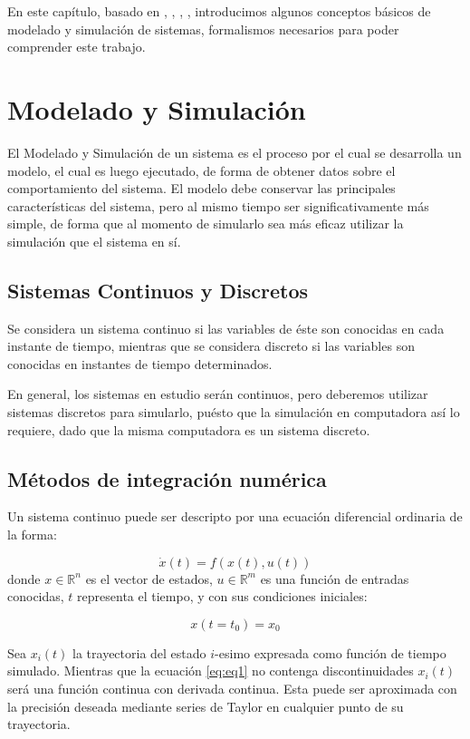 	En este capítulo, basado en \cite{Fer12}, \cite{Ber12Th}, \cite{BK11}, \cite{BK13}, introducimos algunos conceptos básicos de modelado y 
	simulación de sistemas, formalismos necesarios para poder comprender este trabajo. 

\section{Modelado y Simulación}
	El Modelado y Simulación\cite{Zeigler} de un sistema es el proceso por el cual se desarrolla un modelo, el cual es luego ejecutado, de forma de obtener datos 
	sobre el comportamiento del sistema.  El modelo debe conservar las principales características del sistema, pero al mismo tiempo ser significativamente 
	más simple, de forma que al momento de simularlo sea más eficaz utilizar la simulación que el sistema en sí.

	\subsection{Sistemas Continuos y Discretos}
	Se considera un sistema continuo si las variables de éste son conocidas en cada instante de tiempo, mientras que se considera discreto si las 
	variables son conocidas en instantes de tiempo determinados.

	En general, los sistemas en estudio serán continuos, pero deberemos utilizar sistemas discretos para simularlo, puésto que la simulación en 
	computadora así lo requiere, dado que la misma computadora es un sistema discreto.

	\subsection{Métodos de integración numérica} \label{sec:num_integ}
	Un sistema continuo puede ser descripto por una ecuación diferencial ordinaria de la forma:

	\begin{equation} \label{eq:eq1}
	\dot{x}(t) = f (x(t), u(t))
	\end{equation}
	donde $x \in \mathbb{R}^n$  es el vector de estados, $u \in \mathbb{R}^m$ es una función de entradas conocidas,
	$t$ representa el tiempo, y con sus condiciones iniciales:

	\begin{equation} \label{eq:eq2}
	x(t = t_0 ) = x_0
	\end{equation}

	Sea $x_i (t)$ la trayectoria del estado $i$-esimo expresada como función de tiempo simulado. 
	Mientras que la ecuación  \eqref{eq:eq1} no contenga discontinuidades $x_i (t)$ será una función continua con derivada continua. 
	Esta puede ser aproximada con la precisión deseada mediante series de Taylor en cualquier punto de su trayectoria.

